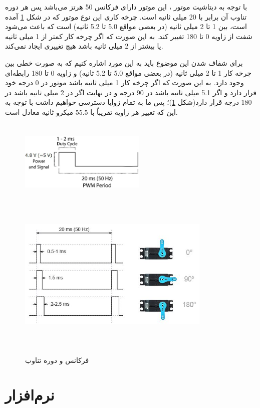 با توجه به دیتاشیت موتور ، این موتور دارای فرکانس 50 هرتز می‌باشد پس هر دوره تناوب آن برابر با 20 میلی ثانیه است. چرخه کاری این نوع موتور که در شکل \ref{SG90} آمده است، بین 1 تا 2 میلی ثانیه (در بعضی مواقع 5.0 تا 5.2 ثانیه) است که باعث می‌شود شفت از زاویه 0 تا 180 تغییر کند. به این صورت که اگر چرخه کار کمتر از 1 میلی ثانیه یا بیشتر از 2 میلی ثانیه باشد هیچ تغییری ایجاد نمی‌کند.

برای شفاف شدن این موضوع باید به این مورد اشاره کنیم که به صورت خطی بین چرخه کار 1 تا 2 میلی ثانیه (در بعضی مواقع 5.0 تا 5.2 ثانیه) و زاویه 0 تا 180 رابطه‌ای وجود دارد. به این صورت که اگر چرخه کار 1 میلی ثانیه باشد موتور در 0 درجه خود قرار دارد و اگر 5.1 میلی ثانیه باشد در 90 درجه و در نهایت اگر در 2 میلی ثانیه باشد در 180 درجه قرار دارد(شکل \ref{SG90})؛ پس ما به تمام زوایا دسترسی خواهیم داشت با توجه به این که تغییر هر زاویه تقریباً با 55.5 میکرو ثانیه معادل است.

    \begin{figure}[!h]
	\centering
	\includegraphics[height=4cm,width=6cm]{./Images/CH4/PWM_SG90_1.png}
	\includegraphics[height=7.6cm,width=9.2cm]{./Images/CH4/PWM_SG90_3.JPG}
	\caption[فرکانس و دوره تناوب ]{فرکانس و دوره تناوب }
	\label{SG90}
	\end{figure}
	
\section{نرم‌افزار }

